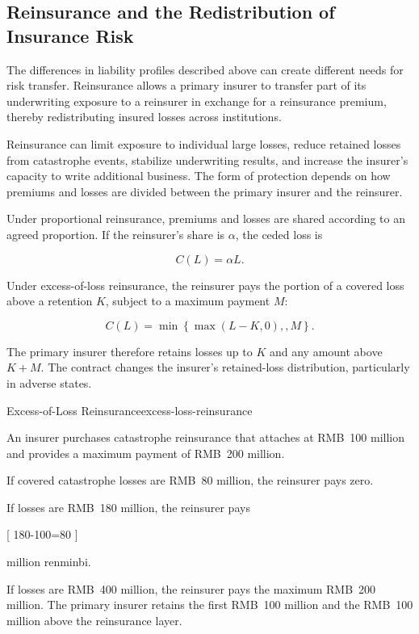 \subsection{Reinsurance and the Redistribution of Insurance Risk}


The differences in liability profiles described above can create different needs for risk transfer. Reinsurance allows a primary insurer to transfer part of its underwriting exposure to a reinsurer in exchange for a reinsurance premium, thereby redistributing insured losses across institutions.


Reinsurance can limit exposure to individual large losses, reduce retained losses from catastrophe events, stabilize underwriting results, and increase the insurer's capacity to write additional business. The form of protection depends on how premiums and losses are divided between the primary insurer and the reinsurer.

Under proportional reinsurance, premiums and losses are shared according to an agreed proportion. If the reinsurer's share is $\alpha$, the ceded loss is

\begin{equation}
C(L)=\alpha L.
\label{eq:ch15-proportional-reinsurance-payoff}
\end{equation}

Under excess-of-loss reinsurance, the reinsurer pays the portion of a covered loss above a retention $K$, subject to a maximum payment $M$:

\begin{equation}
C(L)=\min\left\{\max(L-K,0),,M\right\}.
\label{eq:ch15-excess-of-loss}
\end{equation}

The primary insurer therefore retains losses up to $K$ and any amount above $K+M$. The contract changes the insurer's retained-loss distribution, particularly in adverse states.

\begin{example}{Excess-of-Loss Reinsurance}{excess-loss-reinsurance}

An insurer purchases catastrophe reinsurance that attaches at RMB~100 million and provides a maximum payment of RMB~200 million.

If covered catastrophe losses are RMB~80 million, the reinsurer pays zero.

If losses are RMB~180 million, the reinsurer pays

[
180-100=80
]

million renminbi.

If losses are RMB~400 million, the reinsurer pays the maximum RMB~200 million. The primary insurer retains the first RMB~100 million and the RMB~100 million above the reinsurance layer.

\end{example}


